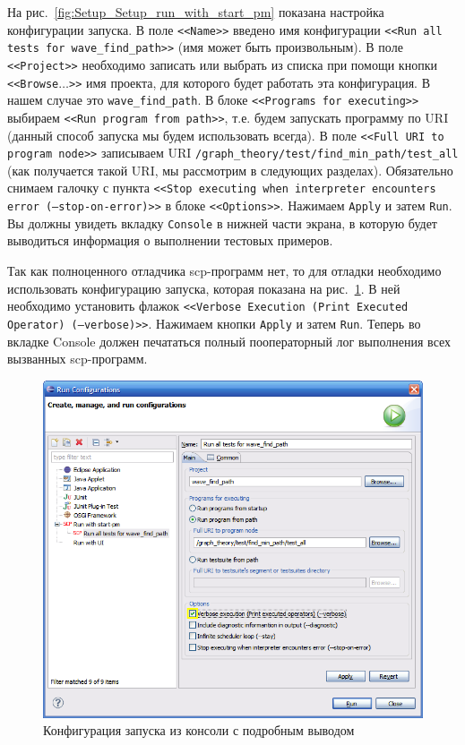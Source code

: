На рис.~\ref{fig:Setup_Setup_run_with_start_pm} показана настройка
конфигурации запуска. В поле \texttt{<<Name>>} введено имя
конфигурации \texttt{<<Run all tests for wave\_find\_path>>} (имя
может быть произвольным). В поле \texttt{<<Project>>} необходимо
записать или выбрать из списка при помощи кнопки
\texttt{<<Browse$\dots$>>} имя проекта, для которого будет работать
эта конфигурация. В нашем случае это \verb|wave_find_path|. В блоке
\texttt{<<Programs for executing>>} выбираем \texttt{<<Run program
  from path>>}, т.е. будем запускать программу по URI (данный способ
запуска мы будем использовать всегда). В поле \texttt{<<Full URI to
  program node>>} записываем URI
\verb|/graph_theory/test/find_min_path/test_all| (как получается такой
URI, мы рассмотрим в следующих разделах). Обязательно снимаем галочку
с пункта \texttt{<<Stop executing when interpreter encounters error
  (--stop-on-error)>>} в блоке \texttt{<<Options>>}. Нажимаем
\texttt{Apply} и затем \texttt{Run}. Вы должны увидеть вкладку
\texttt{Console} в нижней части экрана, в которую будет выводиться
информация о выполнении тестовых примеров.

Так как полноценного отладчика scp-программ нет, то для отладки
необходимо использовать конфигурацию запуска, которая показана на
рис.~\ref{fig:Setup_Run_conf_with_verbose_output}. В ней необходимо
установить флажок \texttt{<<Verbose Execution (Print Executed
  Operator) (--verbose)>>}. Нажимаем кнопки \texttt{Apply} и затем
\texttt{Run}. Теперь во вкладке Console должен печататься полный
пооператорный лог выполнения всех вызванных scp-программ.

\begin{figure}[h!]
  \centering
  \includegraphics[scale=0.7]{images/5/setup/9_Run_conf_with_verbose_output}
  \caption{Конфигурация запуска из консоли с подробным выводом}
  \label{fig:Setup_Run_conf_with_verbose_output}
\end{figure}


